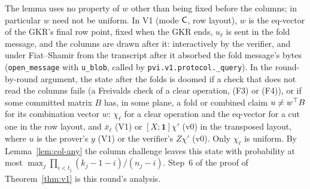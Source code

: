  The lemma uses no property of $w$ other than
being fixed before the columns; in particular $w$ need not be uniform. In V1 (mode $\mathsf{C}$, row
layout), $w$ is the eq-vector of the GKR's final row point, fixed when the GKR ends, $u_\ell$ is sent
in the fold message, and the columns are drawn after it: interactively by the verifier, and under
Fiat--Shamir from the transcript after it absorbed the fold message's bytes
(\texttt{open\_message} with \texttt{u\_blob}, called by \texttt{pvi.v1.protocol.\_query}). In the
round-by-round argument, the state after the folds is doomed if a check that does not read the
columns fails (a Freivalds check of a clear operation, (F3) or (F4)), or if some committed matrix
$B$ has, in some plane, a fold or combined claim
$u\neq w^\top B$ for its combination vector $w$: $\chi_\ell$ for a clear operation and the eq-vector
for a cut one in the row layout, and $\bar x_\ell$ (V1) or $[X;\mathbf 1]\chi'$ (v0) in the
transposed layout, where $u$ is the prover's $y$ (V1) or the verifier's $Z\chi'$ (v0). Only
$\chi_\ell$ is uniform. By
Lemma~\ref{lem:col-any} the column challenge leaves this state with probability at most
$\max_j\prod_{i<t_j}(k_j-1-i)/(n_j-i)$. Step~6 of the proof of Theorem~\ref{thm:v1} is this round's
analysis.

